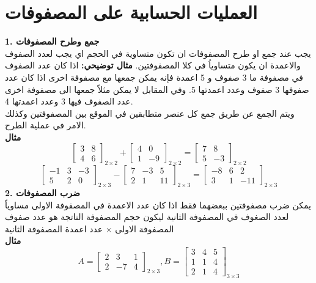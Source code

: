 \section*{العمليات الحسابية على المصفوفات}
\textbf{1. جمع وطرح المصفوفات}\\
يجب عند جمع او طرح المصفوفات ان تكون متساوية في الحجم اي يجب لعدد الصفوف والاعمدة ان يكون متساوياُ في كلا المصفوفتين.
\newpage
\noindent
\textbf{مثال توضيحي:} اذا كان عدد الصفوف في مصفوفة ما 3 صفوف و 5 اعمدة فإنه يمكن جمعها مع مصفوفة اخرى اذا كان عدد صفوفها 3 صفوف وعدد اعمدتها 5. وفي المقابل لا يمكن مثلاً جمعها الى مصفوفة اخرى عدد الصفوف فيها 3 وعدد اعمدتها 4.\\
ويتم الجمع عن طريق جمع كل عنصر متطابقين في الموقع بين المصفوفتين وكذلك الامر في عملية الطرح.\\ [10pt]
\noindent
\textbf{مثال}
\[
\begin{bmatrix}
	3 & 8\\
	4 & 6
\end{bmatrix}_{2\times2}
+
\begin{bmatrix}
	4 & 0\\
	1 & -9
\end{bmatrix}_{2\times2}
=
\begin{bmatrix}
	7 & 8\\
	5 & -3
\end{bmatrix}_{2\times2}
\]
\vspace{10pt}
\[
\begin{bmatrix}
	-1 & 3 & -3\\
	5  & 2 & 0
\end{bmatrix}_{2\times3}
-
\begin{bmatrix}
	7 & -3 & 5\\
	2  & 1 &11
\end{bmatrix}_{2\times3}
=
\begin{bmatrix}
	-8 & 6 & 2\\
	3  & 1 & -11
\end{bmatrix}_{2\times3}
\]
\textbf{2. ضرب المصفوفات}\\
يمكن ضرب مصفوفتين ببعضهما فقط اذا كان عدد الاعمدة في المصفوفة الاولى مساوياً لعدد الصغوف في المصفوفة الثانية ليكون حجم المصفوفة الناتجة هو عدد صفوف المصفوفة الاولى × عدد اعمدة المصفوفة الثانية\\
\noindent
\textbf{مثال}
\[
A = 
\begin{bmatrix}
	2 & 3 & 1\\
	2 & -7 &4
\end{bmatrix}_{2\times 3}
, B =
\begin{bmatrix}
	3 &4& 5\\
	1 &1 &4\\
	2 &1& 4 
\end{bmatrix}_{3\times 3}
\]
